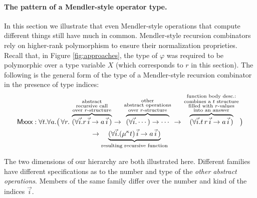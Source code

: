 \paragraph{The pattern of a Mendler-style operator type.}
In this section we illustrate that even Mendler-style operations that
compute different things still have much in common.
Mendler-style recursion combinators rely on
higher-rank polymorphism to ensure their normalization proprieties. 
Recall that, in Figure \ref{fig:approaches},
the type of $\varphi$ was required to be polymorphic over a type variable
$X$ (which corresponds to $r$ in this section).
The following is the general form of the type of a Mendler-style
recursion combinator in the presence of type indices:
\begin{multline*}
 \textsf{Mxxx} : \forall t . \forall a .
   \big(\, \forall r . \;
      \overset{\begin{smallmatrix}
                        \text{abstract} \\
                        \text{recursive call} \\
                        \text{over $r$-structure}
                       \end{smallmatrix}}{\overbrace{
            (\forall\vec{i} . r\,\vec{i} -> a\,\vec{i}\,) }}
   -> \overset{\begin{smallmatrix}
                        \text{other} \\
                        \text{abstract operations} \\
                        \text{over $r$-structure}
                       \end{smallmatrix}}{\overbrace{
            (\forall\vec{i} . \cdots) -> \cdots }}
   -> \overset{\begin{smallmatrix}
                        \text{function body desc.:} \\
                        \text{combines a $t$ structure}\\
                        \text{filled with $r$-values} \\
                        \text{into an answer}
                       \end{smallmatrix}}{\overbrace{
            (\forall\vec{i} . t\, r\, \vec{i}  -> a\,\vec{i}\,) }}
   \big) \\
 -> \underset{\text{resulting recursive function}}{\underbrace{
       (\forall\vec{i} . (\mu^\kappa t)\,\vec{i} -> a\,\vec{i}\,) }}
\end{multline*}


The two dimensions of our hierarchy are both illustrated here.
Different families have different specifications as to the number and
type of the {\it other abstract operations}. Members of the same family
differ over the number and kind of the indices $\vec{i}$.

